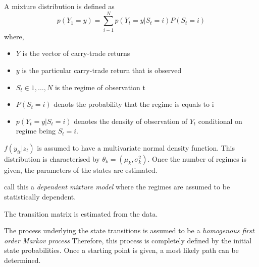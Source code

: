 \documentclass[12pt, a4paper, oneside]{article} %
\begin{document}
A mixture distribution is defined as 
\begin{equation}
p(Y_1 = y) = \sum_{i - 1}^N p(Y_t = y|S_t = i)P(S_t = i)
\end{equation}
where,
\begin{itemize}
\item $Y$ is the vector of carry-trade returns
\item $y$ is the particular carry-trade return that is observed
\item $S_t \in {1, \dots, N}$ is the regime of observation t
\item $P(S_t = i)$ denots the probability that the regime is equals to i 
\item $p(Y_t = y|S_t = i)$ denotes the density of observation of $Y_t$ conditional on regime being $S_t = i$.
\end{itemize}


$f(y_{it}|z_t)$ is assumed to have a multivariate normal density function. This distribution is characterised by $\theta_k = (\mu_k, \sigma_k^2)$. Once the number of regimes is given, the parameters of the states are estimated.  


\citet{depmixS4} call this a \emph{dependent mixture model} where the regimes are assumed to be statistically dependent.  

The transition matrix is estimated from the data. 

The process underlying the state transitions is assumed to be a \emph{homogenous first order Markov process}  Therefore, this process is completely defined by the initial state probabilities. Once a starting point is given, a most likely path can be determined.  
\end{document}
